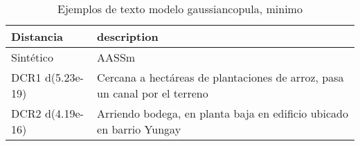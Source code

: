 \begin{table}[H]
\centering
\fontsize{10}{14}\selectfont
\caption{Ejemplos de texto modelo gaussiancopula, minimo}
\label{table-example-economicos-b-2-gaussiancopula-min-text}
\begin{tabular}{|l|m{35em}|}
\hline
\rowcolor[gray]{0.8}
Distancia & description \\
\hline Sintético & AASSm \\
\hline DCR1 d(5.23e-19) & Cercana a hect\'areas  de plantaciones de arroz, pasa un canal por el terreno \\
\hline DCR2 d(4.19e-16) & Arriendo bodega, en planta baja en edificio ubicado en barrio Yungay \\
\hline
\end{tabular}
\end{table}
